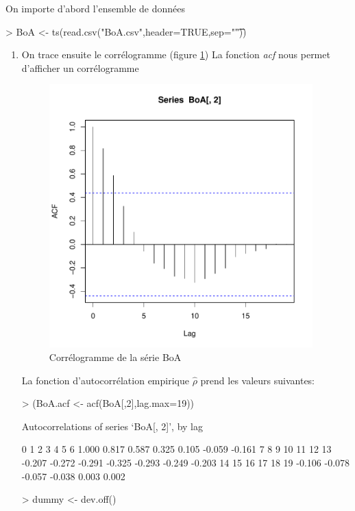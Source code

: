 \begin{solution}{1.6}
On importe d'abord l'ensemble de données
\begin{Schunk}
\begin{Sinput}
> BoA <- ts(read.csv("BoA.csv",header=TRUE,sep="\t"))
\end{Sinput}
\end{Schunk}

\begin{enumerate}
\item
On trace ensuite le corrélogramme (figure \ref{fig:exercice1.6-graph1})
La fonction \emph{acf} nous permet d'afficher un corrélogramme
\begin{figure}[!ht]
\centering
\includegraphics[height=4in, width=4in]{exercice1-6-graph1}
\caption{Corrélogramme de la série BoA}
\label{fig:exercice1.6-graph1}
\end{figure}

La fonction d'autocorrélation empirique $\hat{\rho}$ prend les valeurs
suivantes:
\begin{Schunk}
\begin{Sinput}
> (BoA.acf <- acf(BoA[,2],lag.max=19))
\end{Sinput}
\begin{Soutput}
Autocorrelations of series ‘BoA[, 2]’, by lag

     0      1      2      3      4      5      6
 1.000  0.817  0.587  0.325  0.105 -0.059 -0.161
     7      8      9     10     11     12     13
-0.207 -0.272 -0.291 -0.325 -0.293 -0.249 -0.203
    14     15     16     17     18     19
-0.106 -0.078 -0.057 -0.038  0.003  0.002
\end{Soutput}
\begin{Sinput}
> dummy <- dev.off()
\end{Sinput}
\end{Schunk}


\end{enumerate}
\end{solution}
